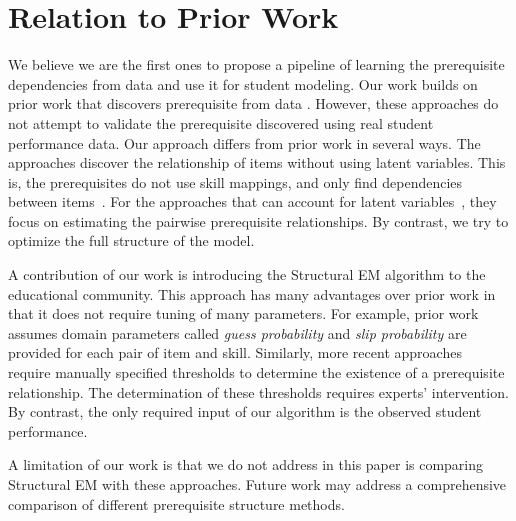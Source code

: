 \documentclass{edm_template}
\begin{document}
{	\section{Relation to Prior Work\label{sec:relatedwork}}
	We believe we are the first ones to propose a pipeline of learning the prerequisite dependencies from data and use it for student modeling. 
	Our work builds on prior work that discovers prerequisite  from data \cite{desmarais2006learned,vuong2010method, brunskill2010estimating,scheines2014discovering,chen2015discovering,piech2015deep}.
	However, these approaches do not attempt to validate the prerequisite discovered using real student performance data.
	Our approach differs from prior work in several ways.
	The approaches  discover the relationship of items without using latent variables.
	This is, the prerequisites do not use skill mappings, and only find dependencies between items~\cite{desmarais2006learned,vuong2010method,piech2015deep}.
	For the approaches that can account for latent variables~\cite{brunskill2010estimating,chen2015discovering}, they focus on estimating the pairwise prerequisite relationships.
	By contrast, we try to optimize the full structure of the model.
	
	A contribution of our work is introducing the Structural EM algorithm to the educational community.
	This approach has many advantages over prior work in that it does not require tuning of many parameters.
	For example, prior work~\cite{brunskill2010estimating} assumes  domain parameters called \emph{guess probability} and \emph{slip probability}
	are provided for each pair of item and skill.
	Similarly, more recent approaches~\cite{chen2015discovering} require manually specified thresholds to determine the existence of a prerequisite relationship.
	The determination of these thresholds requires experts' intervention. 
	By contrast, the only required input of our algorithm is the observed student performance.
	
	A limitation of our work is that we do not address in this paper is comparing Structural EM with these approaches.
	Future work may address a comprehensive comparison of different prerequisite structure methods.
	
}
\end{document}
